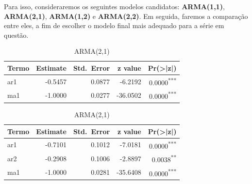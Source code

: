 \documentclass[
]{article}
\begin{document}
Para isso, consideraremos os seguintes modelos candidatos:
\textbf{ARMA(1,1)}, \textbf{ARMA(2,1)}, \textbf{ARMA(1,2)} e
\textbf{ARMA(2,2)}. Em seguida, faremos a comparação entre eles, a fim
de escolher o modelo final mais adequado para a série em questão.

\newpage

\begin{table}[!ht]
  \centering
  \caption{Coeficientes e testes-z dos modelos ARMA}
  \label{tab:coef_arma}
  \begin{subtable}[t]{0.45\textwidth}
    \centering
    \caption{ARMA(1,1)}
    \begin{tabular}{lrrrr}
      \toprule
      Termo & Estimate & Std.\ Error & z value & Pr(>|z|)\\
      \midrule
      ar1 & -0.5457 & 0.0877 & -6.2192 & 0.0000\textsuperscript{***}\\
      ma1 & -1.0000 & 0.0277 & -36.0502 & 0.0000\textsuperscript{***}\\
      \bottomrule
    \end{tabular}
  \end{subtable}%
  \hfill
  \begin{subtable}[t]{0.45\textwidth}
    \centering
    \caption{ARMA(2,1)}
    \begin{tabular}{lrrrr}
      \toprule
      Termo & Estimate & Std.\ Error & z value & Pr(>|z|)\\
      \midrule
      ar1 & -0.7101 & 0.1012 & -7.0181 & 0.0000\textsuperscript{***}\\
      ar2 & -0.2908 & 0.1006 & -2.8897 & 0.0038\textsuperscript{**}\\
      ma1 & -1.0000 & 0.0281 & -35.6408 & 0.0000\textsuperscript{***}\\
      \bottomrule
    \end{tabular}
  \end{subtable}

  \medskip


\end{table}
\end{document}
